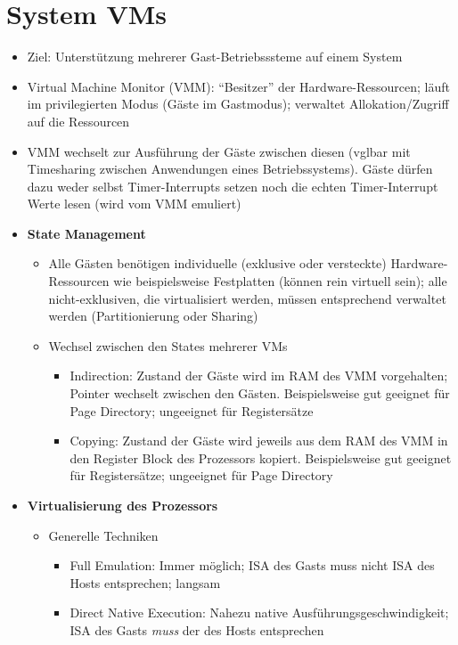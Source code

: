 \section{System VMs}
\begin{itemize}
	\item Ziel: Unterstützung mehrerer Gast-Betriebsssteme auf einem System
	\item Virtual Machine Monitor (VMM): "`Besitzer"' der Hardware-Ressourcen; läuft im privilegierten Modus (Gäste im Gastmodus); verwaltet Allokation/Zugriff auf die Ressourcen
	\item VMM wechselt zur Ausführung der Gäste zwischen diesen (vglbar mit Timesharing zwischen Anwendungen eines Betriebssystems). Gäste dürfen dazu weder selbst Timer-Interrupts setzen noch die echten Timer-Interrupt Werte lesen (wird vom VMM emuliert) %
	\item \textbf{State Management}
	\begin{itemize}
		\item Alle Gästen benötigen individuelle (exklusive oder versteckte) Hardware-Ressourcen wie beispielsweise Festplatten (können rein virtuell sein); alle nicht-exklusiven, die virtualisiert werden, müssen entsprechend verwaltet werden (Partitionierung oder Sharing)
		\item Wechsel zwischen den States mehrerer VMs
		\begin{itemize}
			\item Indirection: Zustand der Gäste wird im RAM des VMM vorgehalten; Pointer wechselt zwischen den Gästen. Beispielsweise gut geeignet für Page Directory; ungeeignet für Registersätze %
			\item Copying: Zustand der Gäste wird jeweils aus dem RAM des VMM in den Register Block des Prozessors kopiert. Beispielsweise gut geeignet für Registersätze; ungeeignet für Page Directory
		\end{itemize}
	\end{itemize}
	\item \textbf{Virtualisierung des Prozessors}
	\begin{itemize}
		\item Generelle Techniken
		\begin{itemize}
			\item Full Emulation: Immer möglich; ISA des Gasts muss nicht ISA des Hosts entsprechen; langsam
			\item Direct Native Execution: Nahezu native Ausführungsgeschwindigkeit; ISA des Gasts \textit{muss} der des Hosts entsprechen

\end{itemize}
\end{itemize}
\end{itemize}
